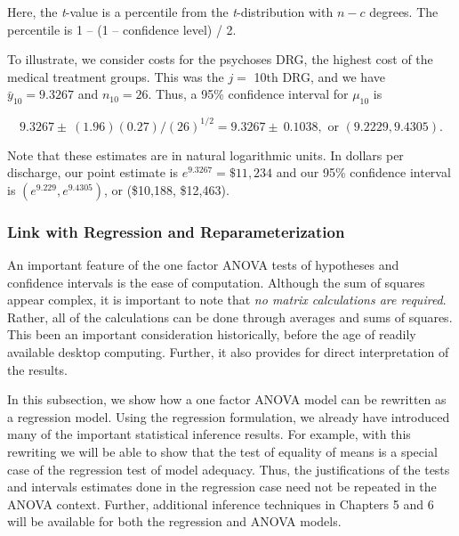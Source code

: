 \noindent Here, the \textit{t}-value is a percentile from the
\textit{t}-distribution with $n-c$ degrees. The percentile is 1 --
(1 -- confidence level) / 2.

To illustrate, we consider costs for the psychoses DRG, the highest cost of
the medical treatment groups. This was the $j=$ 10th DRG, and we have $\bar{y%
}_{10}=9.3267$ and $n_{10}=26$. Thus, a 95\% confidence interval for $\mu
_{10}$ is

\begin{equation*}
9.3267\pm \ (1.96)(0.27)/(26)^{1/2}=9.3267\pm \ 0.1038,\text{ or }%
(9.2229,9.4305).
\end{equation*}

Note that these estimates are in natural logarithmic units. In dollars per
discharge, our point estimate is $e^{9.3267}=\$11,234$ and our 95\%
confidence interval is $(e^{9.229},e^{9.4305})$, or (\$10,188, \$12,463).

\subsubsection*{Link with Regression and Reparameterization}

An important feature of the one factor ANOVA tests of hypotheses and
confidence intervals is the ease of computation. Although the sum of
squares appear complex, it is important to note that \emph{no matrix
calculations are required}. Rather, all of the calculations can be
done through averages and sums of squares. This been an important
consideration historically, before the age of readily available
desktop computing. Further, it also provides for direct
interpretation of the results.

In this subsection, we show how a one factor ANOVA model can be
rewritten as a regression model. Using the regression formulation,
we already have introduced many of the important statistical
inference results. For example, with this rewriting we will be able
to show that the test of equality of means is a special case of the
regression test of model adequacy. Thus, the justifications of the
tests and intervals estimates done in the regression case need not
be repeated in the ANOVA context. Further, additional inference
techniques in Chapters 5 and 6 will be available for both the
regression and ANOVA models.

